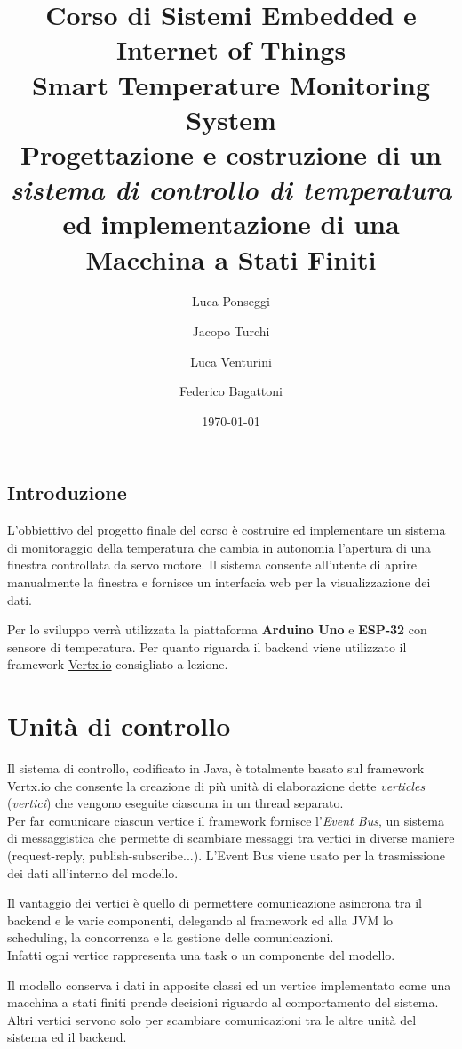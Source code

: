 \documentclass{report}
\title{
\normalsize{Corso di Sistemi Embedded e Internet of Things}\\
\Huge{Smart Temperature Monitoring System}\\
\vspace{0.75em}
\large{Progettazione e costruzione di un \textit{sistema di controllo di temperatura} ed implementazione di una Macchina a Stati Finiti}
}
\author{Luca Ponseggi \and Jacopo Turchi \and Luca Venturini \and Federico Bagattoni}
\date{\today}
\begin{document}
\maketitle

\tableofcontents
\newpage
\section*{Introduzione}
\par{
L'obbiettivo del progetto finale del corso è costruire ed implementare un sistema di monitoraggio della temperatura che cambia in autonomia l'apertura di una finestra controllata da servo motore. Il sistema consente all'utente di aprire manualmente la finestra e fornisce un interfacia web per la visualizzazione dei dati.
}
\par{
Per lo sviluppo verrà utilizzata la piattaforma \textbf{Arduino Uno} e \textbf{ESP-32} con sensore di temperatura. Per quanto riguarda il backend viene utilizzato il framework \href{https://vertx.io/}{Vertx.io} consigliato a lezione.
}

\chapter{Unità di controllo}
\par {
Il sistema di controllo, codificato in Java, è totalmente basato sul framework Vertx.io che consente la creazione di più unità di elaborazione dette \textit{verticles} (\textit{vertici}) che vengono eseguite ciascuna in un thread separato. \\
Per far comunicare ciascun vertice il framework fornisce l'\textit{Event Bus}, un sistema di messaggistica che permette di scambiare messaggi tra vertici in diverse maniere (request-reply, publish-subscribe...). L'Event Bus viene usato per la trasmissione dei dati all'interno del modello. 
}
\par {
Il vantaggio dei vertici è quello di permettere comunicazione asincrona tra il backend e le varie componenti, delegando al framework ed alla JVM lo scheduling, la concorrenza e la gestione delle comunicazioni. \\
Infatti ogni vertice rappresenta una task o un componente del modello.
}
\par {
Il modello conserva i dati in apposite classi ed un vertice implementato come una macchina a stati finiti prende decisioni riguardo al comportamento del sistema. Altri vertici servono solo per scambiare comunicazioni tra le altre unità del sistema ed il backend.
}
\end{document}

